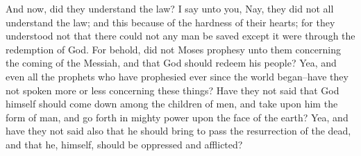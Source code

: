 And now, did they understand the law? I say unto you, Nay, they did not all understand the law; and this because of the hardness of their hearts; for they understood not that there could not any man be saved except it were through the redemption of God.
\bverse \iffalse For behold, did not Moses prophesy unto them concerning the coming of the Messiah, and that God should redeem his people?  Yea, and even all the prophets who have prophesied ever since the world began--have they not spoken more or less concerning these things? \fi
For behold, did not Moses prophesy unto them concerning the coming of the Messiah, and that God should redeem his people?  Yea, and even all the prophets who have prophesied ever since the world began--have they not spoken more or less concerning these things?
\bverse \iffalse Have they not said that God himself should come down among the children of men, and take upon him the form of man, and go forth in mighty power upon the face of the earth? \fi
Have they not said that God himself should come down among the children of men, and take upon him the form of man, and go forth in mighty power upon the face of the earth?
\bverse \iffalse Yea, and have they not said also that he should bring to pass the resurrection of the dead, and that he, himself, should be oppressed and afflicted? \fi
Yea, and have they not said also that he should bring to pass the resurrection of the dead, and that he, himself, should be oppressed and afflicted?

